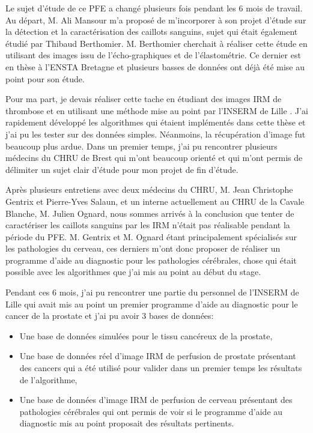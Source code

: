 Le sujet d'étude de ce PFE a changé plusieurs fois pendant les 6 mois de travail. Au départ, M. Ali Mansour m'a proposé de m'incorporer à son projet d'étude sur la détection et la caractérisation des caillots sanguins, sujet qui était également étudié par Thibaud Berthomier. M. Berthomier cherchait à réaliser cette étude en utilisant des images issu de l'écho-graphiques et de l'élastométrie. Ce dernier est en thèse à l'ENSTA Bretagne et plusieurs basses de données ont déjà été mise au point pour son étude. 

\medskip

Pour ma part, je devais réaliser cette tache en étudiant des images IRM de thrombose et en utilisant une méthode mise au point par l'INSERM de Lille \cite{tartare2014contribution}. J'ai rapidement développé les algorithmes qui étaient implémentés dans cette thèse et j'ai pu les tester sur des données simples. Néanmoins, la récupération d'image fut beaucoup plus ardue. Dans un premier temps, j'ai pu rencontrer plusieurs médecins du CHRU de Brest qui m'ont beaucoup orienté et qui m'ont permis de délimiter un sujet clair d'étude pour mon projet de fin d'étude.

\medskip

Après plusieurs entretiens avec deux médecins du CHRU, M. Jean Christophe Gentrix et Pierre-Yves Salaun, et un interne actuellement au CHRU de la Cavale Blanche, M. Julien Ognard, nous sommes arrivés à la conclusion que tenter de caractériser  les caillots sanguins par les IRM n'était pas réalisable pendant la période du PFE. M. Gentrix et M. Ognard étant principalement spécialisés sur les pathologies du cerveau, ces derniers m'ont donc proposer de réaliser un programme d'aide au diagnostic pour les pathologies cérébrales, chose qui était possible avec les algorithmes que j'ai mis au point au début du stage.

\medskip

Pendant ces 6 mois, j'ai pu rencontrer une partie du personnel de l'INSERM de Lille qui avait mis au point un premier programme d'aide au diagnostic pour le cancer de la prostate et j'ai pu avoir 3 bases de données:

\begin{itemize}
\item Une base de données simulées pour le tissu cancéreux de la prostate,
\item Une base de données réel d'image IRM de perfusion de prostate présentant des cancers qui a été utilisé pour valider dans un premier temps les résultats de l'algorithme,
\item Une base de données d'image IRM de perfusion de cerveau présentant des pathologies cérébrales qui ont permis de voir si le programme d'aide au diagnostic mis au point proposait des résultats pertinents.
\end{itemize}

